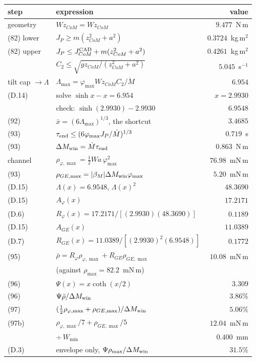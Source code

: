 \documentclass[11pt]{article}
\newcommand{\Wz}{W\!z_{CoM}}
\newcommand{\rmax}{\rho_{\max}}
\newcommand{\rbar}{\bar\rho}
\begin{document}
\begin{center}\small
\begin{tabular}{@{}llr@{}}
\toprule
step & expression & value \\
\midrule
geometry & $\Wz = Wz_{CoM}$ & $9.477$~N\,m\\
(82) lower & $J_P \ge m(z_{CoM}^2+a^2)$ & $0.3724$~kg\,m$^2$\\
(82) upper & $J_P \le J_{CoM}^{\rm CAD} + m(z_{CoM}^2+a^2)$ & $0.4261$~kg\,m$^2$\\
       & $C_2 \le \sqrt{g z_{CoM}/(z_{CoM}^2+a^2)}$ & $5.045$~s$^{-1}$\\
\midrule
tilt cap $\to\Lambda$ & $\Lambda_{\max} = \varphi_{\max}\Wz C_2/\dot M$ & $6.954$\\
(D.14) & solve $\sinh x - x = 6.954$ & $x = 2.9930$\\
       & \quad check: $\sinh(2.9930) - 2.9930$ & $6.9548$\\
(92)   & $\bar x = (6\Lambda_{\max})^{1/3}$, the shortcut & $3.4685$\\
(93)   & $\tau_{\rm end}\le(6\varphi_{\max}J_P/\dot M)^{1/3}$ & $0.719$~s\\
(93)   & $\Delta M_{\rm win} = \dot M\tau_{\rm end}$ & $0.863$~N\,m\\
\midrule
channel& $\rho_{\varphi,\max} = \tfrac12W a\,\varphi_{\max}^2$ & $76.98$~mN\,m\\
(93)   & $\rho_{GE,\max} = |\beta_M|\Delta M_{\rm win}\varphi_{\max}$ & $5.20$~mN\,m\\
\midrule
(D.15) & $\Lambda(x) = 6.9548$, $\Lambda(x)^2$ & $48.3690$\\
(D.15) & $A_\varphi(x)$ & $17.2171$\\
(D.6)  & $R_\varphi(x) = 17.2171/[(2.9930)(48.3690)]$ & $0.1189$\\
(D.15) & $A_{GE}(x)$ & $11.0389$\\
(D.7)  & $R_{GE}(x) = 11.0389/[(2.9930)^2(6.9548)]$ & $0.1772$\\
(95)   & $\rbar = R_\varphi\rho_{\varphi,\max}+R_{GE}\rho_{GE,\max}$
       & $10.08$~mN\,m\\
       & (against $\rmax = 82.2$~mN\,m) & \\
\midrule
(96)   & $\Psi(x) = x\coth(x/2)$ & $3.309$\\
(96)   & $\Psi\rbar/\Delta M_{\rm win}$ & $3.86\%$\\
(97)   & $(\tfrac12\rho_{\varphi,\max}+\rho_{GE,\max})/\Delta M_{\rm win}$
       & $5.06\%$\\
(97b)  & $\rho_{\varphi,\max}/7 + \rho_{GE,\max}/5$ & $12.04$~mN\,m\\
       & $\div\,W_{\min}$ & $0.400$~mm\\
\midrule
(D.3)  & envelope only, $\Psi\rmax/\Delta M_{\rm win}$ & $31.5\%$\\
\bottomrule
\end{tabular}
\end{center}
\end{document}
